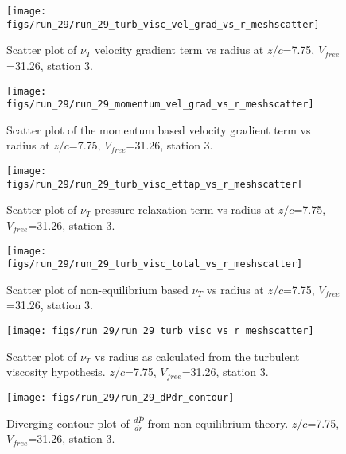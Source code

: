\begin{figure}[H]
\centering
\texttt{[image: figs/run\_29/run\_29\_turb\_visc\_vel\_grad\_vs\_r\_meshscatter]}
\caption{Scatter plot of $\nu_T$ velocity gradient term vs radius at $z/c$=7.75, $V_{free}$=31.26, station 3.}
\end{figure}


\begin{figure}[H]
\centering
\texttt{[image: figs/run\_29/run\_29\_momentum\_vel\_grad\_vs\_r\_meshscatter]}
\caption{Scatter plot of the momentum based velocity gradient term vs radius at $z/c$=7.75, $V_{free}$=31.26, station 3.}
\end{figure}


\begin{figure}[H]
\centering
\texttt{[image: figs/run\_29/run\_29\_turb\_visc\_ettap\_vs\_r\_meshscatter]}
\caption{Scatter plot of $\nu_T$ pressure relaxation term vs radius at $z/c$=7.75, $V_{free}$=31.26, station 3.}
\end{figure}


\begin{figure}[H]
\centering
\texttt{[image: figs/run\_29/run\_29\_turb\_visc\_total\_vs\_r\_meshscatter]}
\caption{Scatter plot of non-equilibrium based $\nu_T$ vs radius at $z/c$=7.75, $V_{free}$=31.26, station 3.}
\end{figure}


\begin{figure}[H]
\centering
\texttt{[image: figs/run\_29/run\_29\_turb\_visc\_vs\_r\_meshscatter]}
\caption{Scatter plot of $\nu_T$ vs radius as calculated from the turbulent viscosity hypothesis. $z/c$=7.75, $V_{free}$=31.26, station 3.}
\end{figure}


\begin{figure}[H]
\centering
\texttt{[image: figs/run\_29/run\_29\_dPdr\_contour]}
\caption{Diverging contour plot of $\frac{d\bar{P}}{dr}$ from non-equilibrium theory. $z/c$=7.75, $V_{free}$=31.26, station 3.}
\end{figure}


